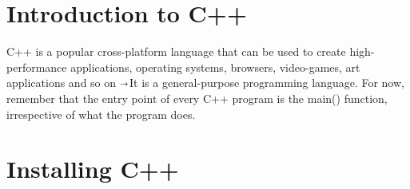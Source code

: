 \documentclass[12pt , a4paper]{article}
\newcommand{\arrow}{$\shortrightarrow$}
\begin{document}
%
%
\section{Introduction to C++}
C++ is a popular cross-platform language that can be used to create high-performance applications, operating systems, browsers, video-games, art applications and so on \arrow It is a general-purpose programming language.
For now, remember that the entry point of every C++ program is the main() function, irrespective of what the program does.
\newpage
%
%
\section{Installing C++}
\end{document}
